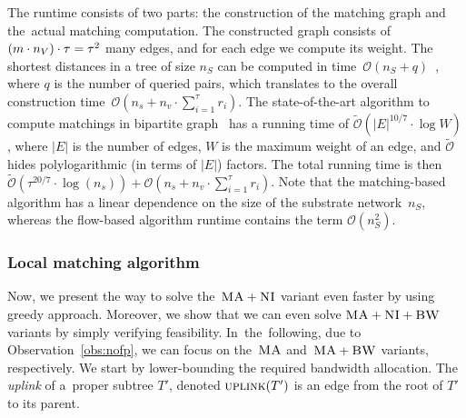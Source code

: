 The runtime consists of two parts: the construction of the matching graph and
the~actual matching computation. The constructed graph consists of
$(m \cdot n_V) \cdot \tau = \tau^2$
many edges,
and for each edge we compute its weight. The shortest distances
in a tree of size $n_S$ can be computed in time~$\mathcal{O}(n_S + q)$~\cite{offline-lca}, where $q$ is the number of queried pairs, which translates to the overall construction time~$\mathcal{O}(n_s + n_v\cdot \sum_{i=1}^\tau r_i)$.
The state-of-the-art algorithm to compute matchings in bipartite graph~\cite{matching-best} has a running time of $\tilde{\mathcal{O}}(|E|^{10/7}\cdot \log W)$, where $|E|$ is the number of edges, $W$ is the maximum weight of an edge, and $\tilde{\mathcal{O}}$ hides polylogarithmic (in terms of $|E|$) factors.
The total running time is then $\tilde{\mathcal{O}}(\tau^{20/7}\cdot \log(n_s)) + \mathcal{O}(n_s + n_v\cdot \sum_{i=1}^\tau r_i)$.
Note that the matching-based algorithm has a linear dependence on the size of the substrate network~$n_S$, whereas the flow-based algorithm runtime contains the term $\mathcal{O}(n_S^2)$.


\subsubsection{Local matching algorithm}

Now, we present the way to solve the~$\textsc{MA}+\textsc{NI}$ variant even faster by using greedy approach.
Moreover, we show that we can
even solve
$\textsc{MA}+\textsc{NI}+\textsc{BW}$ variants by simply
verifying feasibility.
In~the~following, due to Observation~\ref{obs:nofp}, we can focus on
the~$\textsc{MA}$ and~$\textsc{MA}+\textsc{BW}$ variants, respectively.
We start by lower-bounding the required bandwidth allocation.
The \emph{uplink} of a~proper subtree $T'$, denoted $\textsc{uplink}(T')$ is an edge from the root of $T'$ to its parent.

%
%


